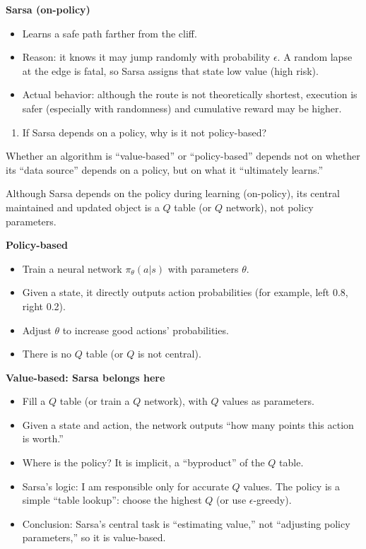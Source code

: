 \textbf{Sarsa (on-policy)}

\begin{itemize}
\tightlist
\item
  Learns a safe path farther from the cliff.
\item
  Reason: it knows it may jump randomly with probability \(\epsilon\). A random lapse at the edge is fatal, so Sarsa assigns that state low value (high risk).
\item
  Actual behavior: although the route is not theoretically shortest, execution is safer (especially with randomness) and cumulative reward may be higher.
\end{itemize}

\begin{enumerate}
\def\labelenumi{\arabic{enumi}.}
\setcounter{enumi}{3}
\tightlist
\item
  If Sarsa depends on a policy, why is it not policy-based?
\end{enumerate}

Whether an algorithm is ``value-based'' or ``policy-based'' depends not on whether its ``data source'' depends on a policy, but on what it ``ultimately learns.''

Although Sarsa depends on the policy during learning (on-policy), its central maintained and updated object is a \(Q\) table (or \(Q\) network), not policy parameters.

\textbf{Policy-based}

\begin{itemize}
\tightlist
\item
  Train a neural network \(\pi_\theta(a|s)\) with parameters \(\theta\).
\item
  Given a state, it directly outputs action probabilities (for example, left 0.8, right 0.2).
\item
  Adjust \(\theta\) to increase good actions' probabilities.
\item
  There is no \(Q\) table (or \(Q\) is not central).
\end{itemize}

\textbf{Value-based: Sarsa belongs here}

\begin{itemize}
\tightlist
\item
  Fill a \(Q\) table (or train a \(Q\) network), with \(Q\) values as parameters.
\item
  Given a state and action, the network outputs ``how many points this action is worth.''
\item
  Where is the policy? It is implicit, a ``byproduct'' of the \(Q\) table.
\item
  Sarsa's logic: I am responsible only for accurate \(Q\) values. The policy is a simple ``table lookup'': choose the highest \(Q\) (or use \(\epsilon\)-greedy).
\item
  Conclusion: Sarsa's central task is ``estimating value,'' not ``adjusting policy parameters,'' so it is value-based.
\end{itemize}

